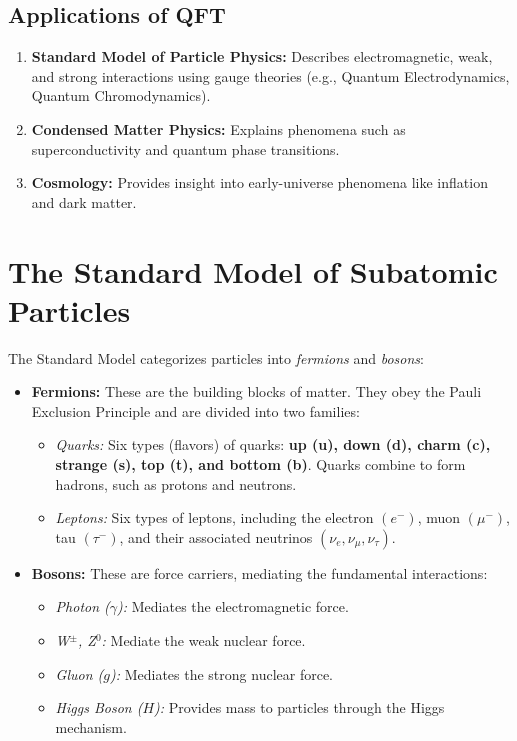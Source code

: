 \subsection{Applications of QFT}
\begin{enumerate}
    \item \textbf{Standard Model of Particle Physics:} Describes electromagnetic, weak, and strong interactions using gauge theories (e.g., Quantum Electrodynamics, Quantum Chromodynamics).
    \item \textbf{Condensed Matter Physics:} Explains phenomena such as superconductivity and quantum phase transitions.
    \item \textbf{Cosmology:} Provides insight into early-universe phenomena like inflation and dark matter.
\end{enumerate}



\section{The Standard Model of Subatomic Particles}
The Standard Model categorizes particles into \textit{fermions} and \textit{bosons}:
\begin{itemize}
    \item \textbf{Fermions:} These are the building blocks of matter. They obey the Pauli Exclusion Principle and are divided into two families:
    \begin{itemize}
        \item \textit{Quarks:} Six types (flavors) of quarks: \textbf{up (u), down (d), charm (c), strange (s), top (t), and bottom (b)}. Quarks combine to form hadrons, such as protons and neutrons.
        \item \textit{Leptons:} Six types of leptons, including the electron $(e^-)$, muon $(\mu^-)$, tau $(\tau^-)$, and their associated neutrinos $(\nu_e, \nu_\mu, \nu_\tau)$.
    \end{itemize}
    \item \textbf{Bosons:} These are force carriers, mediating the fundamental interactions:
    \begin{itemize}
        \item \textit{Photon ($\gamma$):} Mediates the electromagnetic force.
        \item \textit{W$^\pm$, Z$^0$:} Mediate the weak nuclear force.
        \item \textit{Gluon ($g$):} Mediates the strong nuclear force.
        \item \textit{Higgs Boson ($H$):} Provides mass to particles through the Higgs mechanism.
    \end{itemize}
\end{itemize}

